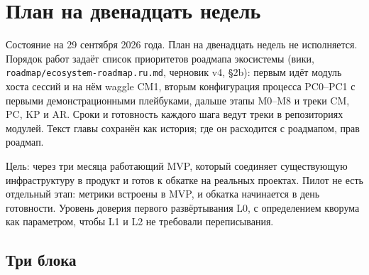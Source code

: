 \chapter{План на двенадцать недель}

\begin{warnbox}
Состояние на 29 сентября 2026 года. План на двенадцать недель не исполняется. Порядок работ задаёт список приоритетов роадмапа экосистемы (вики, \texttt{roadmap/ecosystem-roadmap.ru.md}, черновик v4, §2b): первым идёт модуль хоста сессий и на нём waggle CM1, вторым конфигурация процесса PC0--PC1 с первыми демонстрационными плейбуками, дальше этапы M0--M8 и треки CM, PC, KP и AR. Сроки и готовность каждого шага ведут треки в репозиториях модулей. Текст главы сохранён как история; где он расходится с роадмапом, прав роадмап.
\end{warnbox}

Цель: через три месяца работающий MVP, который соединяет существующую инфраструктуру в продукт и готов к обкатке на реальных проектах. Пилот не есть отдельный этап: метрики встроены в MVP, и обкатка начинается в день готовности. Уровень доверия первого развёртывания L0, с определением кворума как параметром, чтобы L1 и L2 не требовали переписывания.

\section{Три блока}

